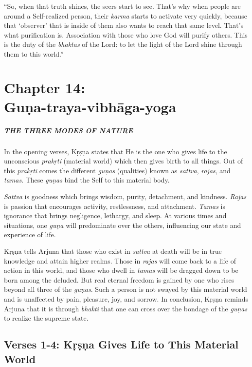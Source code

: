 \documentclass[12pt, twoside, openright]{memoir}
\begin{document}
\enquote{So, when that truth shines, the seers start to see. That’s why when people are around a Self-realized person, their \textit{karma} starts to activate very quickly, because that \enquote{observer} that is inside of them also wants to reach that same level. That’s what purification is. Association with those who love God will purify others. This is the duty of the \textit{bhaktas} of the Lord: to let the light of the Lord shine through them to this world.} \chapter{Chapter 14: \\Guṇa-traya-vibhāga-yoga}\label{chap-guna-traya-vibhaga-yoga}

\paragraph*{\MakeUppercase{The Three Modes of Nature}}


\noindent In the opening verses, Kṛṣṇa states that He is the one who gives life to the unconscious \textit{prakṛti} (material world) which then gives birth to all things. Out of this \textit{prakṛti} comes the different \textit{guṇas} (qualities) known as \textit{sattva}, \textit{rajas}, and \textit{tamas}. These \textit{guṇas} bind the Self to this material body.

\textit{Sattva} is goodness which brings wisdom, purity, detachment, and kindness. \textit{Rajas} is passion that encourages activity, restlessness, and attachment. \textit{Tamas} is ignorance that brings negligence, lethargy, and sleep. At various times and situations, one \textit{guṇa} will predominate over the others, influencing our state and experience of life.

Kṛṣṇa tells Arjuna that those who exist in \textit{sattva} at death will be in true knowledge and attain higher realms. Those in \textit{rajas} will come back to a life of action in this world, and those who dwell in \textit{tamas} will be dragged down to be born among the deluded. But real eternal freedom is gained by one who rises beyond all three of the \textit{guṇas}. Such a person is not swayed by this material world and is unaffected by pain, pleasure, joy, and sorrow. In conclusion, Kṛṣṇa reminds Arjuna that it is through \textit{bhakti} that one can cross over the bondage of the \textit{guṇas} to realize the supreme state.

\section{Verses 1-4: Kṛṣṇa Gives Life to This Material World}\label{sec-verses-1-4-krsna-gives-life-to-this-material-world}
\end{document}
